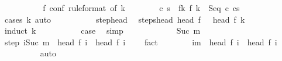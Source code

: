 \begin{isabellebody}
\ \ \ \ \isamarkupfalse%
\isanewline
\ \ \ \ \isamarkupfalse%
\ f{\isacharunderscore}{}\ conf\ {\isacharbrackleft}rule{\isacharunderscore}format{\isacharcomma}\ of\ {\isachardoublequoteopen}k\ {\isacharminus}\ {}{\isachardoublequoteclose}{\isacharbrackright}\isanewline
\ \ \ \ \isamarkupfalse%
\ c{\isacharprime}\ s{\isacharprime}\ \ f{\isacharunderscore}k{\isacharcolon}\ {\isachardoublequoteopen}f\ k\ {\isacharequal}\ {\isacharparenleft}Seq\ c{\isacharprime}\ cs{\isacharprime}{\isacharparenright}{\isachardoublequoteclose}\isanewline
\ \ \ \ \ \ \isamarkupfalse%
\ {\isacharparenleft}cases\ k{\isacharparenright}\ auto\isanewline
\ \ \ \ \isamarkupfalse%
\isanewline
\ \ \ \ \isamarkupfalse%
\ step{\isacharunderscore}head\ \isamarkupfalse%
\ steps{\isacharunderscore}head{\isacharcolon}\ {\isachardoublequoteopen}{\isasymGamma}{\isasymturnstile}head\ {\isacharparenleft}f\ {}{\isacharparenright}\ {\isasymrightarrow}\isactrlsup {\isacharasterisk}\ head\ {\isacharparenleft}f\ k{\isacharparenright}{\isachardoublequoteclose}\isanewline
\ \ \ \ \isamarkupfalse%
\ {\isacharparenleft}induct\ k{\isacharparenright}\isanewline
\ \ \ \ \ \ \isamarkupfalse%
\ {}\ \isamarkupfalse%
\ {\isacharquery}case\ \isamarkupfalse%
\ simp\isanewline
\ \ \ \ \isamarkupfalse%
\isanewline
\ \ \ \ \ \ \isamarkupfalse%
\ {\isacharparenleft}Suc\ m{\isacharparenright}\isanewline
\ \ \ \ \ \ \isamarkupfalse%
\ step{\isacharcolon}\ {\isachardoublequoteopen}{\isasymforall}i{\isacharless}Suc\ m{\isachardot}\ {\isasymGamma}{\isasymturnstile}\ head\ {\isacharparenleft}f\ i{\isacharparenright}\ {\isasymrightarrow}\ head\ {\isacharparenleft}f\ {\isacharparenleft}i\ {\isacharplus}\ {}{\isacharparenright}{\isacharparenright}{\isachardoublequoteclose}\ \isamarkupfalse%
\ fact\isanewline
\ \ \ \ \ \ \isamarkupfalse%
\ {\isachardoublequoteopen}{\isasymforall}i{\isacharless}m{\isachardot}\ {\isasymGamma}{\isasymturnstile}\ head\ {\isacharparenleft}f\ i{\isacharparenright}\ {\isasymrightarrow}\ head\ {\isacharparenleft}f\ {\isacharparenleft}i\ {\isacharplus}\ {}{\isacharparenright}{\isacharparenright}{\isachardoublequoteclose}\isanewline
\ \ \ \ \ \ \ \ \isamarkupfalse%
\ auto\isanewline
\ \ \ \ \ \ \isamarkupfalse%

\end{isabellebody}
